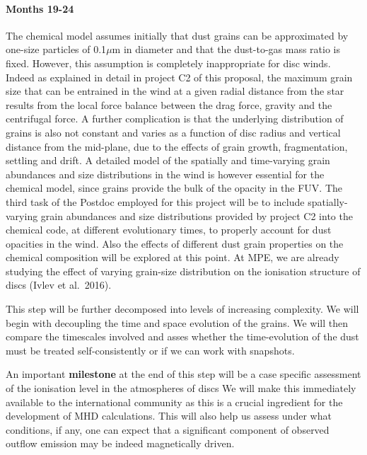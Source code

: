 \documentclass[10pt,fleqn,twoside]{article}
\begin{document}
\paragraph{ Months 19-24}

 The chemical model assumes initially that dust grains can be approximated by one-size particles of 0.1${\mu}$m in diameter and that the dust-to-gas mass ratio is fixed.  However, this assumption is completely inappropriate for disc winds. Indeed as explained in detail in project C2 of this proposal, the maximum grain size that can be entrained in the wind at a given radial distance from the star results from the local force balance between the drag force, gravity and the centrifugal force. A further complication is that the underlying distribution of grains is also not constant and varies as a function of disc radius and vertical distance from the mid-plane, due to the effects of grain growth, fragmentation, settling and drift. A detailed model of the spatially and time-varying grain abundances and size distributions in the wind is however essential for the chemical model, since grains provide the bulk of the opacity in the FUV. The third task of the Postdoc employed for this project will be to include spatially-varying grain abundances and size distributions
provided by project C2 into the chemical code, at different evolutionary times, to properly account for dust opacities in the wind.  Also the effects of different dust grain properties on the chemical composition will be explored at this point.  At MPE, we are already studying the effect of varying grain-size distribution on the ionisation structure of discs (Ivlev et al.\ 2016). 

This step will be further decomposed into levels of increasing complexity. We will begin with decoupling the time and space evolution of the grains. We will then compare the timescales involved and asses whether the time-evolution of the dust must be treated self-consistently or if we can work with snapshots. 

An important {\bf milestone} at the end of this step will be a case specific assessment of the ionisation level in the atmospheres of discs We will make this immediately available to the international community as this is a crucial ingredient for the development of MHD calculations. This will also help us assess under what conditions, if any, one can expect that a significant component of observed outflow emission may be indeed magnetically driven. 
\end{document}
